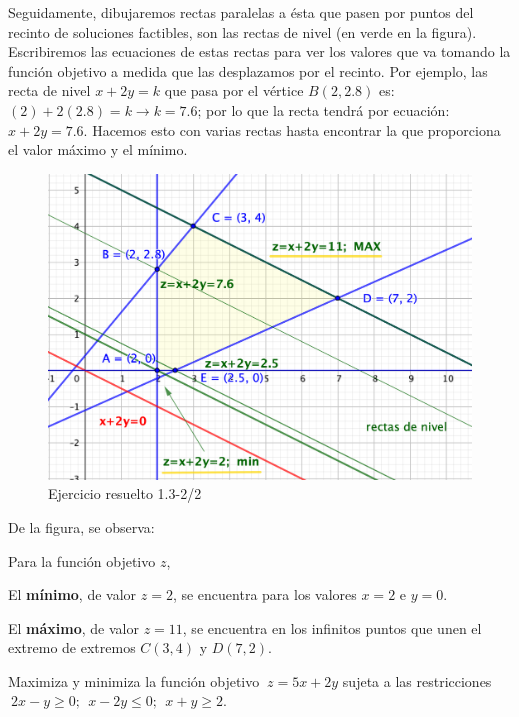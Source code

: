 Seguidamente, dibujaremos rectas paralelas a ésta que pasen por puntos del recinto de soluciones factibles, son las rectas de nivel (en verde en la figura). Escribiremos las ecuaciones de estas rectas para ver los valores que va tomando la función objetivo a medida que las desplazamos por el recinto. \textcolor{gris}{Por ejemplo, las recta de nivel $x+2y=k$ que pasa por el vértice $B(2,2.8)$ es: $(2)+2(2.8)=k \to k=7.6$; por lo que la recta tendrá por ecuación: $x+2y=7.6$.} Hacemos esto con varias rectas hasta encontrar la que proporciona el valor máximo y el mínimo.


\begin{figure}[h]
	\centering
	\includegraphics[width=.75\textwidth]{imagenes/img15.png}
	\caption*{\small{Ejercicio resuelto 1.3-2/2}}
\end{figure}

\vspace{5mm}%
\normalsize{De} la figura, se observa:

\begin{destacado}
Para la función objetivo $z$,

El \textbf{mínimo}, de valor $z=2$, se encuentra para los valores $x=2$ e $y=0$.

El \textbf{máximo}, de valor $z=11$, se encuentra en los infinitos puntos que unen el extremo de extremos $C(3,4)$ y $D(7,2)$.
\end{destacado}


\vspace{15mm}	
\begin{ejemplo}
\begin{ejre}
Maximiza y minimiza la función objetivo $\ z=5x+2y$ sujeta a las restricciones 	$\ 2x-y\ge 0;\ \ x-2y\le 0; \ \ x+y\ge 2$.
\end{ejre}
\end{ejemplo}


